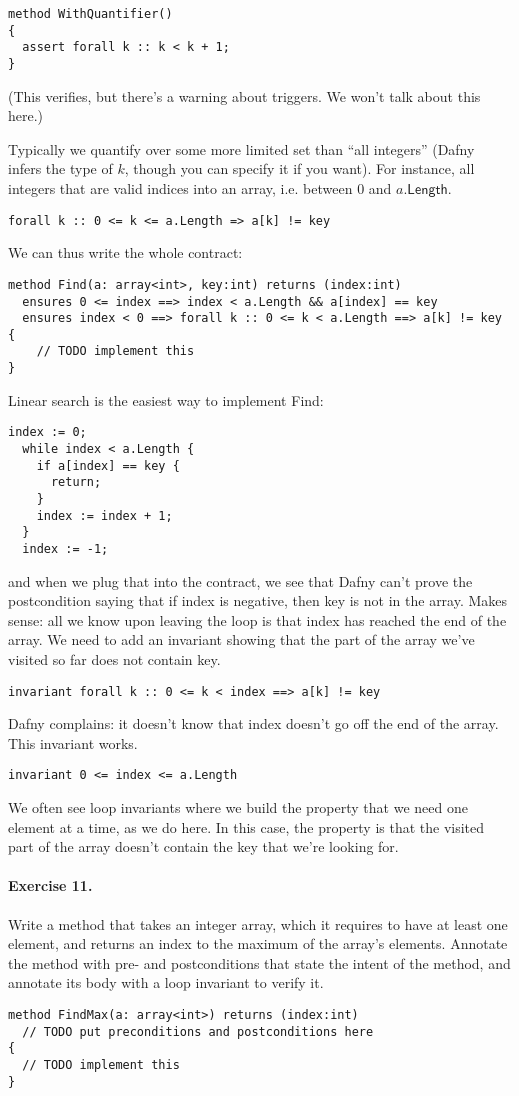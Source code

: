 \documentclass[11pt]{article}
\begin{document}
\begin{lstlisting}[language=dafny]
method WithQuantifier()
{
  assert forall k :: k < k + 1;
}
\end{lstlisting}
(This verifies, but there's a warning about triggers. We won't talk about this here.)

Typically we quantify over some more limited set than ``all integers'' (Dafny infers the type of
$k$, though you can specify it if you want). For instance, all integers that are valid indices into an array,
i.e. between 0 and $a.\mathsf{Length}$.
\begin{lstlisting}[language=dafny]
  forall k :: 0 <= k <= a.Length => a[k] != key
\end{lstlisting}
We can thus write the whole contract:
\begin{lstlisting}[language=dafny]
method Find(a: array<int>, key:int) returns (index:int)
  ensures 0 <= index ==> index < a.Length && a[index] == key
  ensures index < 0 ==> forall k :: 0 <= k < a.Length ==> a[k] != key
{
    // TODO implement this
}
\end{lstlisting}
Linear search is the easiest way to implement \textsf{Find}:
\begin{lstlisting}[language=dafny]
  index := 0;
  while index < a.Length {
    if a[index] == key {
      return;
    }
    index := index + 1;
  }
  index := -1;
\end{lstlisting}
and when we plug that into the contract, we see that Dafny can't prove the postcondition
saying that if \textsf{index} is negative, then \textsf{key} is not in the array. Makes sense:
all we know upon leaving the loop is that \textsf{index} has reached the end of the array.
We need to add an invariant showing that the part of the array we've visited so far does not
contain \textsf{key}.
\begin{lstlisting}[language=dafny]
  invariant forall k :: 0 <= k < index ==> a[k] != key
\end{lstlisting}
Dafny complains: it doesn't know that \textsf{index} doesn't go off the end of the array.
This invariant works.
\begin{lstlisting}[language=dafny]
  invariant 0 <= index <= a.Length
\end{lstlisting}
We often see loop invariants where we build the property that we need one element at a time,
as we do here. In this case, the property is that the visited part of the array doesn't contain
the key that we're looking for.

\paragraph{Exercise 11.} Write a method that takes an integer array, which it requires to have
at least one element, and returns an index to the maximum of the array's elements. Annotate
the method with pre- and postconditions that state the intent of the method, and annotate
its body with a loop invariant to verify it.
\begin{lstlisting}[language=dafny]
method FindMax(a: array<int>) returns (index:int)
  // TODO put preconditions and postconditions here  
{
  // TODO implement this
}
\end{lstlisting}
\end{document}
